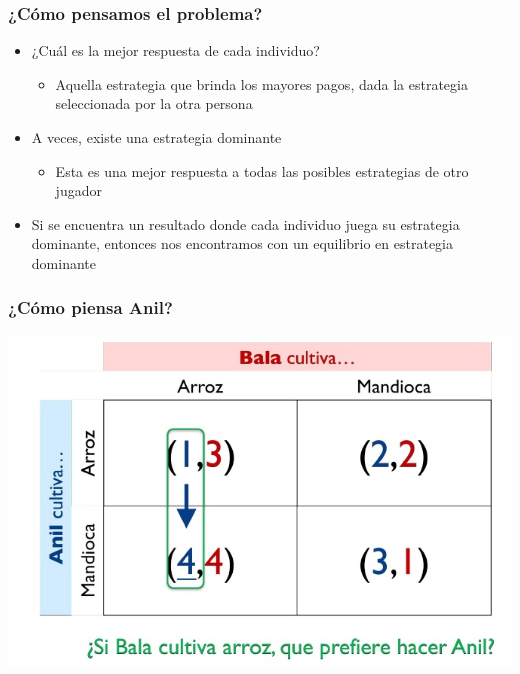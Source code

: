 \documentclass{beamer}
\begin{document}
\begin{frame}
\frametitle{¿Cómo pensamos el problema?}
\begin{itemize}
    \item ¿Cuál es la mejor respuesta de cada individuo?
        \begin{itemize}
        \item Aquella estrategia que brinda los mayores pagos, dada la estrategia seleccionada por la otra persona
        \end{itemize}
    \item A veces, existe una estrategia dominante
        \begin{itemize}
        \item Esta es una mejor respuesta a todas las posibles estrategias de otro jugador
        \end{itemize}
    \item Si se encuentra un resultado donde cada individuo juega su estrategia dominante, entonces nos encontramos con un equilibrio en estrategia dominante
\end{itemize}
\end{frame}

\begin{frame}
\frametitle{ ¿Cómo piensa Anil?}
\centering
\includegraphics[scale=0.6]{Slides Principios de Economia/Figures/Tema_03_13_bala.jpg}
\end{frame}
\end{document}
